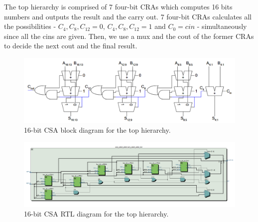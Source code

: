 \documentclass[12pt]{article}
\begin{document}
The top hierarchy is comprised of 7 four-bit CRAs which computes 16 bits numbers and outputs the result and the carry out. 7 four-bit CRAs calculates all the possibilities - $C_4,C_8,C_{12}=0$, $C_4,C_8,C_{12}=1$ and $C_0=cin$ - simultaneously since all the cins are given. Then, we use a mux and the cout of the former CRAs to decide the next cout and the final result.

\begin{figure}[H]
    \centering
    \includegraphics[width=15cm]{16_bit_CSA.png}
    \caption{16-bit CSA block diagram for the top hierarchy. \cite{GG4.6}}
\end{figure}

\begin{figure}[H]
    \centering
    \includegraphics[width=18cm]{CSA_RTL.png}
    \caption{16-bit CSA RTL diagram for the top hierarchy.}
\end{figure}
\end{document}
